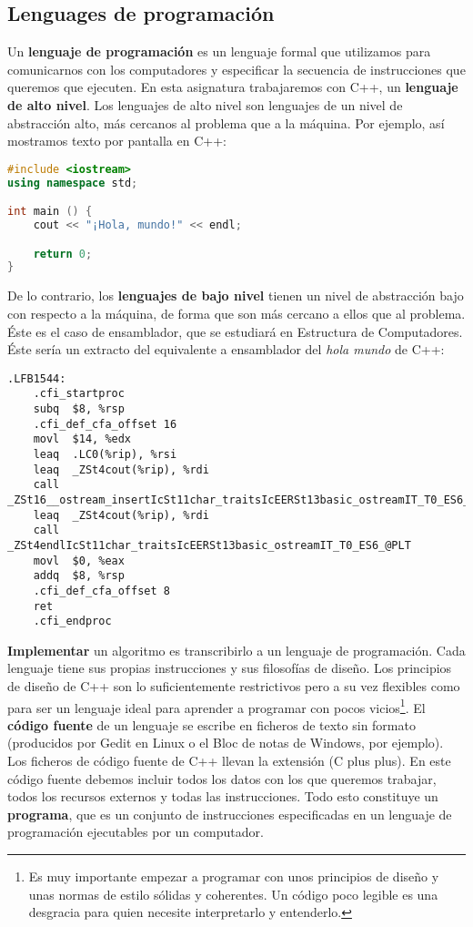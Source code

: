 \subsection{Lenguages de programación}

Un \textbf{lenguaje de programación} es un lenguaje formal que utilizamos para comunicarnos con los computadores y especificar la secuencia de instrucciones que queremos que ejecuten.
En esta asignatura trabajaremos con C++, un \textbf{lenguaje de alto nivel}.
Los lenguajes de alto nivel son lenguajes de un nivel de abstracción alto, más cercanos al problema que a la máquina.
Por ejemplo, así mostramos texto por pantalla en C++:

\begin{lstlisting}[language=C++]
#include <iostream>
using namespace std;

int main () {
	cout << "¡Hola, mundo!" << endl;

	return 0;
}
\end{lstlisting}

De lo contrario, los \textbf{lenguajes de bajo nivel} tienen un nivel de abstracción bajo con respecto a la máquina, de forma que son más cercano a ellos que al problema.
Éste es el caso de ensamblador, que se estudiará en Estructura de Computadores.
Éste sería un extracto del equivalente a ensamblador del \textit{hola mundo} de C++:

\begin{lstlisting}[language={[x86masm]Assembler}]
.LFB1544:
	.cfi_startproc
	subq  $8, %rsp
	.cfi_def_cfa_offset 16
	movl  $14, %edx
	leaq  .LC0(%rip), %rsi
	leaq  _ZSt4cout(%rip), %rdi
	call  _ZSt16__ostream_insertIcSt11char_traitsIcEERSt13basic_ostreamIT_T0_ES6_PKS3_l@PLT
	leaq  _ZSt4cout(%rip), %rdi
	call  _ZSt4endlIcSt11char_traitsIcEERSt13basic_ostreamIT_T0_ES6_@PLT
	movl  $0, %eax
	addq  $8, %rsp
	.cfi_def_cfa_offset 8
	ret
	.cfi_endproc
\end{lstlisting}

\textbf{Implementar} un algoritmo es transcribirlo a un lenguaje de programación.
Cada lenguaje tiene sus propias instrucciones y sus filosofías de diseño.
Los principios de diseño de C++ son lo suficientemente restrictivos pero a su vez flexibles como para ser un lenguaje ideal para aprender a programar con pocos vicios\footnote{Es muy importante empezar a programar con unos principios de diseño y unas normas de estilo sólidas y coherentes. Un código poco legible es una desgracia para quien necesite interpretarlo y entenderlo.}.
El \textbf{código fuente} de un lenguaje se escribe en ficheros de texto sin formato (producidos por Gedit en Linux o el Bloc de notas de Windows, por ejemplo).
Los ficheros de código fuente de C++ llevan la extensión  (C plus plus).
En este código fuente debemos incluir todos los datos con los que queremos trabajar, todos los recursos externos y todas las instrucciones.
Todo esto constituye un \textbf{programa}, que es un conjunto de instrucciones especificadas en un lenguaje de programación ejecutables por un computador.

